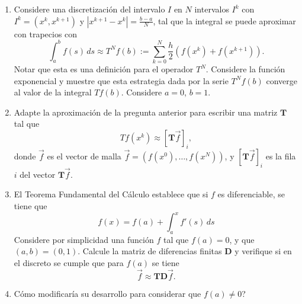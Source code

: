 \documentclass{article}
\newcommand{\pts}[1]{[{\bf #1 puntos}] }
\begin{document}
\begin{enumerate}
        \begin{enumerate}
            \item\pts{1} Considere una discretización del intervalo $I$ en $N$ intervalos $I^k$ con $I^k = (x^k, x^{k+1})$ y $|x^{k+1} - x^k| = \frac{b-a}{N}$, tal que la integral se puede aproximar con trapecios con
                $$ \int_a^b f(s)\,ds \approx T^Nf(b) := \sum_{k=0}^N \frac h 2 \left( f(x^k) + f(x^{k+1})  \right). $$
                Notar que esta es una definición para el operador $T^N$.  Considere la función exponencial y muestre que esta estrategia dada por la serie $T^Nf(b)$ converge al valor de la integral $Tf(b)$. Considere $a=0$, $b=1$.
            \item\pts{1} Adapte la aproximación de la pregunta anterior para escribir una matriz $\mathbf{T}$ tal que 
                $$ Tf(x^k) \approx [\mathbf{T} \vec f]_i, $$
                donde $\vec f$ es el vector de malla $\vec f = (f(x^0), \dots, f(x^N))$, y $[\mathbf T \vec f]_i$ es la fila $i$ del vector $\mathbf T \vec f$. 
            \item\pts{1} El Teorema Fundamental del Cálculo establece que si $f$ es diferenciable, se tiene que 
                    $$ f(x) = f(a) + \int_a^x f'(s)\,ds $$
                    Considere por simplicidad una función $f$ tal que $f(a) = 0$, y que $(a,b)=(0,1)$. Calcule la matriz de diferencias finitas $\mathbf{D}$ y verifique si en el discreto se cumple que para $f(a)$ se tiene
                    $$ \vec f \approx \mathbf{T} \mathbf{D} \vec f. $$
            \item\pts{1} Cómo modificaría su desarrollo para considerar que $f(a)\neq 0$? 
        \end{enumerate}


\end{enumerate}
\end{document}
